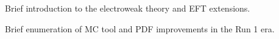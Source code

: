 Brief introduction to the electroweak theory and EFT extensions.

Brief enumeration of MC tool and PDF improvements in the Run 1 era.
